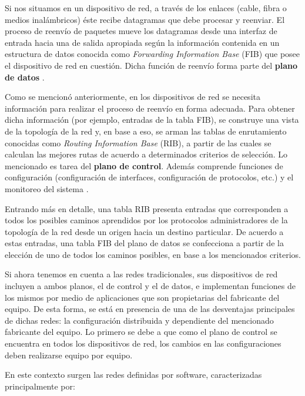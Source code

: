 Si nos situamos en un dispositivo de red, a través de los enlaces (cable, fibra
o medios inalámbricos) éste recibe datagramas que debe procesar y reenviar. El
proceso de reenvío de paquetes mueve los datagramas desde una interfaz de
entrada hacia una de salida apropiada según la información contenida en un
estructura de datos conocida como \textit{Forwarding Information Base} (FIB) que
posee el dispositivo de red en cuestión. Dicha función de reenvío forma parte
del \textbf {plano de datos} \parencite{arch_tradicional}.

Como se mencionó anteriormente, en los dispositivos de red se necesita
información para realizar el proceso de reenvío en forma adecuada. Para obtener
dicha información (por ejemplo, entradas de la tabla FIB), se construye una
vista de la topología de la red y, en base a eso, se arman las tablas de
enrutamiento conocidas como \textit {Routing Information Base} (RIB), a partir
de las cuales se calculan las mejores rutas de acuerdo a determinados criterios
de selección. Lo mencionado es tarea del \textbf {plano de control}. Además
comprende funciones de configuración (configuración de interfaces, configuración
de protocolos, etc.) y el monitoreo del sistema \parencite{arch_tradicional}.

Entrando más en detalle, una tabla RIB presenta entradas que corresponden a
todos los posibles caminos aprendidos por los protocolos administradores de la
topología de la red desde un origen hacia un destino particular. De acuerdo a
estas entradas, una tabla FIB del plano de datos se confecciona a partir de la
elección de uno de todos los caminos posibles, en base a los mencionados
criterios.

Si ahora tenemos en cuenta a las redes tradicionales, sus dispositivos de red
incluyen a ambos planos, el de control y el de datos, e implementan funciones de
los mismos por medio de aplicaciones que son propietarias del fabricante del
equipo. De esta forma, se está en presencia de una de las desventajas
principales de dichas redes: la configuración distribuida y dependiente del mencionado
fabricante del equipo. Lo primero se debe a que como el plano de control se
encuentra en todos los dispositivos de red, los cambios en las configuraciones
deben realizarse equipo por equipo.

En este contexto surgen las redes definidas por software, caracterizadas
principalmente por:

